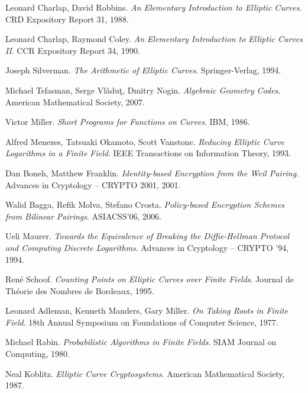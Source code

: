 \begin{thebibliography}{99}

    Leonard Charlap, David Robbins.
    \emph{An Elementary Introduction to Elliptic Curves}.
    CRD Expository Report 31, 1988.

    Leonard Charlap, Raymond Coley.
    \emph{An Elementary Introduction to Elliptic Curves II}.
    CCR Expository Report 34, 1990.

    Joseph Silverman.
    \emph{The Arithmetic of Elliptic Curves}.
    Springer-Verlag, 1994.

    Michael Tsfasman, Serge  Vl\v{a}du\c{t}, Dmitry Nogin.
    \emph{Algebraic Geometry Codes}.
    American Mathematical Society, 2007.

    Victor Miller.
    \emph{Short Programs for Functions on Curves}.
    IBM, 1986.

    Alfred Menezes, Tatsuaki Okamoto, Scott Vanstone.
    \emph{Reducing Elliptic Curve Logarithms in a Finite Field}.
    IEEE Transactions on Information Theory, 1993.

    Dan Boneh, Matthew Franklin.
    \emph{Identity-based Encryption from the Weil Pairing}.
    Advances in Cryptology -- CRYPTO 2001, 2001.

    Walid Bagga, Refik Molva, Stefano Crosta.
    \emph{Policy-based Encryption Schemes from Bilinear Pairings}.
    ASIACSS'06, 2006.

    Ueli Maurer.
    \emph{Towards the Equivalence of Breaking the Diffie-Hellman Protocol
        and Computing Discrete Logarithms}.
    Advances in Cryptology -- CRYPTO '94, 1994.

    René Schoof.
    \emph{Counting Points on Elliptic Curves over Finite Fields}.
    Journal de Théorie des Nombres de Bordeaux, 1995.

    Leonard Adleman, Kenneth Manders, Gary Miller.
    \emph{On Taking Roots in Finite Field}.
    18th Annual Symposium on Foundations of Computer Science, 1977.

    Michael Rabin.
    \emph{Probabilistic Algorithms in Finite Fields}.
    SIAM Journal on Computing, 1980.

    Neal Koblitz.
    \emph{Elliptic Curve Cryptosystems}.
    American Mathematical Society, 1987.


\end{thebibliography}
